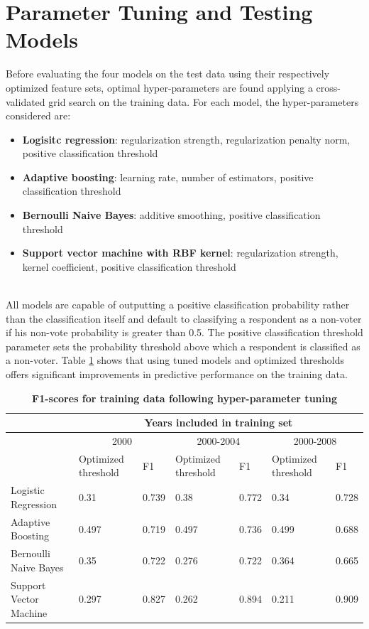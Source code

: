 \documentclass{article}
\begin{document}
	\section{Parameter Tuning and Testing Models}
	
	Before evaluating the four models on the test data using their respectively optimized feature sets, optimal hyper-parameters are found applying a cross-validated grid search on the training data. For each model, the hyper-parameters considered are:
	
	\begin{itemize}
		\item{\textbf{Logisitc regression}: regularization strength, regularization penalty norm, positive classification threshold}
		\item{\textbf{Adaptive boosting}: learning rate, number of estimators, positive classification threshold}
		\item{\textbf{Bernoulli Naive Bayes}: additive smoothing, positive classification threshold}
		\item{\textbf{Support vector machine with RBF kernel}: regularization strength, kernel coefficient, positive classification threshold}
	\end{itemize}
	\hfill \\
	All models are capable of outputting a positive classification probability rather than the classification itself and default to classifying a respondent as a non-voter if his non-vote probability is greater than 0.5. The positive classification threshold parameter sets the probability threshold above which a respondent is classified as a non-voter. Table \ref{table:tuning_training_results} shows that using tuned models and optimized thresholds offers significant improvements in predictive performance on the training data.
		\begin{table}[h]
		\begin{tabular}{|m{4cm}|m{1.5cm}|m{1cm}|m{1.5cm}|m{1cm}|m{1.5cm}|m{1cm}|}
			\hline &
			\multicolumn{6}{|c|}{Years included in training set} \\
			\hline &
			\multicolumn{2}{|c|}{2000} &
			\multicolumn{2}{|c|}{2000-2004} &
			\multicolumn{2}{|c|}{2000-2008} \\
			\hline
			& Optimized threshold & F1 & Optimized threshold & F1 & Optimized threshold & F1 \\
			\hline
			Logistic Regression & 0.31 & 0.739 & 0.38 & 0.772 & 0.34 & 0.728 \\
			\hline
			Adaptive Boosting & 0.497 & 0.719 & 0.497 & 0.736 & 0.499 & 0.688 \\
			\hline
			Bernoulli Naive Bayes & 0.35 & 0.722 & 0.276 & 0.722 & 0.364 & 0.665 \\
			\hline
			Support Vector Machine & 0.297 & 0.827 & 0.262 & 0.894 & 0.211 & 0.909 \\
			\hline
		\end{tabular}
		\caption{\textbf{F1-scores for training data following hyper-parameter tuning}}
		\label{table:tuning_training_results}
	\end{table}
	\hfill \\
\end{document}
